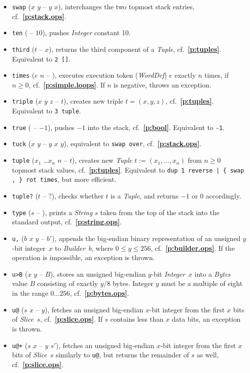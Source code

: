 \documentclass[12pt,oneside]{article}
\def\refpoint#1{{\rm\textbf{\ref{#1}}}}
\let\ptref=\refpoint
\begin{document}
\begin{itemize}
\item {\tt swap} ($x$ $y$ -- $y$ $x$), interchanges the two topmost stack entries, cf.~\ptref{p:stack.ops}.
\item {\tt ten} ( -- $10$), pushes {\em Integer\/} constant 10.
\item {\tt third} ($t$ -- $x$), returns the third component of a {\em Tuple}, cf.~\ptref{p:tuples}. Equivalent to {\tt 2 []}.
\item {\tt times} ($e$ $n$ -- ), executes execution token ({\em WordDef\/}) $e$ exactly $n$ times, if $n\geq0$, cf.~\ptref{p:simple.loops}. If $n$ is negative, throws an exception.
\item {\tt triple} ($x$ $y$ $z$ -- $t$), creates new triple $t=(x,y,z)$, cf.~\ptref{p:tuples}. Equivalent to {\tt 3 tuple}.
\item {\tt true} ( -- $-1$), pushes $-1$ into the stack, cf.~\ptref{p:bool}. Equivalent to {\tt -1}.
\item {\tt tuck} ($x$ $y$ -- $y$ $x$ $y$), equivalent to {\tt swap over}, cf.~\ptref{p:stack.ops}.
\item {\tt tuple} ($x_1$ \dots $x_n$ $n$ -- $t$), creates new {\em Tuple\/} $t:=(x_1,\ldots,x_n)$ from $n\geq0$ topmost stack values, cf.~\ptref{p:tuples}. Equivalent to {\tt dup 1 reverse | \{ swap , \} rot times}, but more efficient.
\item {\tt tuple?} ($t$ -- $?$), checks whether $t$ is a {\em Tuple}, and returns $-1$ or $0$ accordingly.
\item {\tt type} ($s$ -- ), prints a {\em String\/} $s$ taken from the top of the stack into the standard output, cf.~\ptref{p:string.ops}.
\item {\tt u,} ($b$ $x$ $y$ -- $b'$), appends the big-endian binary representation of an unsigned $y$-bit integer~$x$ to {\em Builder\/}~$b$, where $0\leq y\leq 256$, cf.~\ptref{p:builder.ops}. If the operation is impossible, an exception is thrown.
\item {\tt u>B} ($x$ $y$ -- $B$), stores an unsigned big-endian $y$-bit {\em Integer\/}~$x$ into a {\em Bytes\/} value $B$ consisting of exactly $y/8$ bytes. Integer $y$ must be a multiple of eight in the range $0\ldots256$, cf.~\ptref{p:bytes.ops}.
\item {\tt u@} ($s$ $x$ -- $y$), fetches an unsigned big-endian $x$-bit integer from the first $x$ bits of {\em Slice}~$s$, cf.~\ptref{p:slice.ops}. If $s$ contains less than $x$ data bits, an exception is thrown.
\item {\tt u@+} ($s$ $x$ -- $y$ $s'$), fetches an unsigned big-endian $x$-bit integer from the first $x$ bits of {\em Slice}~$s$ similarly to {\tt u@}, but returns the remainder of $s$ as well, cf.~\ptref{p:slice.ops}.

\end{itemize}
\end{document}
